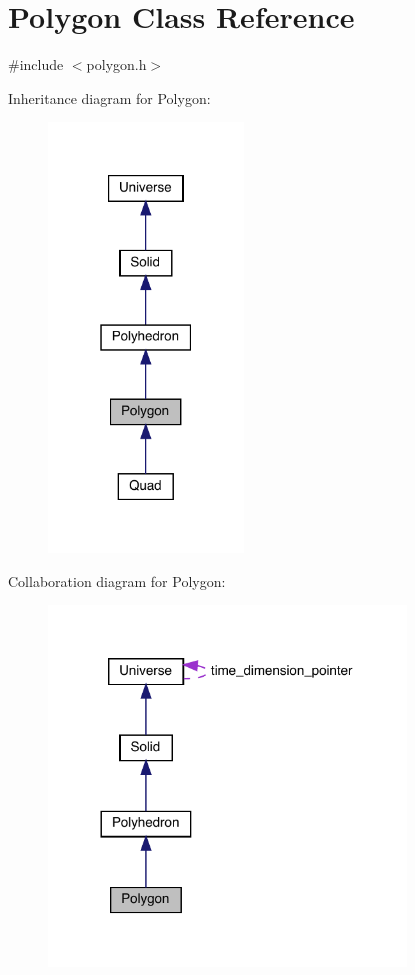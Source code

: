 \hypertarget{class_polygon}{}\section{Polygon Class Reference}
\label{class_polygon}


{\ttfamily \#include $<$polygon.\+h$>$}



Inheritance diagram for Polygon\+:\nopagebreak
\begin{figure}[H]
\begin{center}
\leavevmode
\includegraphics[width=147pt]{class_polygon__inherit__graph}
\end{center}
\end{figure}


Collaboration diagram for Polygon\+:
\nopagebreak
\begin{figure}[H]
\begin{center}
\leavevmode
\includegraphics[width=269pt]{class_polygon__coll__graph}
\end{center}
\end{figure}
